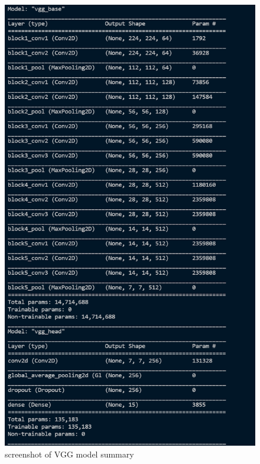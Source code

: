 \begin{figure}[htbp]
    \centering
    \includegraphics[scale=0.6]{vgg16_summary.png}
    \caption{screenshot of VGG model summary}
    \label{fig:vgg_summary}
\end{figure}



